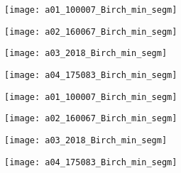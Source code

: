 \begin{figure}[!ht]
    
    \begin{subfigure}[t]{\textwidth+20pt\relax}
    	\centering
    	\texttt{[image: a01\_100007\_Birch\_min\_segm]} 
    \end{subfigure}      
    \begin{subfigure}[b]{0.23\textwidth}
    	\centering
        \texttt{[image: a02\_160067\_Birch\_min\_segm]}
    \end{subfigure}
    \begin{subfigure}[b]{0.23\textwidth}
    	\centering
        \texttt{[image: a03\_2018\_Birch\_min\_segm]}
    \end{subfigure}
    \begin{subfigure}[b]{0.23\textwidth}
    	\centering
        \texttt{[image: a04\_175083\_Birch\_min\_segm]}
    \end{subfigure} \vspace{5pt}
    
    
    \begin{subfigure}[t]{\textwidth+20pt\relax}
    	\centering
    	\texttt{[image: a01\_100007\_Birch\_min\_segm]} 
    \end{subfigure}      
    \begin{subfigure}[b]{0.23\textwidth}
    	\centering
        \texttt{[image: a02\_160067\_Birch\_min\_segm]}
    \end{subfigure}
    \begin{subfigure}[b]{0.23\textwidth}
    	\centering
        \texttt{[image: a03\_2018\_Birch\_min\_segm]}
    \end{subfigure}
    \begin{subfigure}[b]{0.23\textwidth}
    	\centering
        \texttt{[image: a04\_175083\_Birch\_min\_segm]}
    \end{subfigure} \vspace{5pt}
    

\end{figure}
